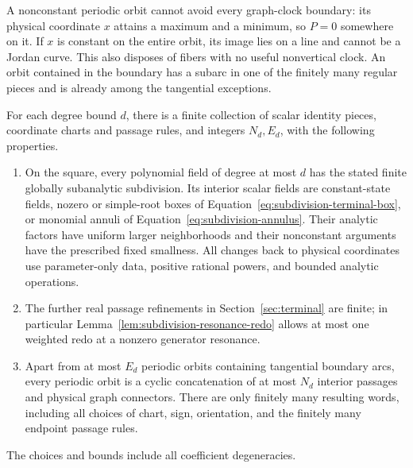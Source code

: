 A nonconstant periodic orbit cannot avoid every graph-clock boundary:
its physical coordinate $x$ attains a maximum and a minimum, so $P=0$
somewhere on it.  If $x$ is constant on the entire orbit, its image lies
on a line and cannot be a Jordan curve.  This also disposes of fibers
with no useful nonvertical clock.  An orbit contained in the boundary
has a subarc in one of the finitely many regular pieces and is already
among the tangential exceptions.

\begin{theorem}
\label{thm:finite-templates}
For each degree bound $d$, there is a finite collection of scalar
identity pieces, coordinate charts and passage rules, and integers
$N_d,E_d$, with the following properties.
\begin{enumerate}
\item On the square, every polynomial field of degree at most $d$ has
the stated finite globally subanalytic subdivision.  Its interior
scalar fields are constant-state fields, nozero or simple-root boxes
of Equation~\eqref{eq:subdivision-terminal-box}, or monomial annuli
of Equation~\eqref{eq:subdivision-annulus}.  Their analytic factors
have uniform larger neighborhoods and their nonconstant arguments
have the prescribed fixed smallness.  All changes back to physical
coordinates use parameter-only data, positive rational powers, and
bounded analytic operations.
\item The further real passage refinements in
Section~\ref{sec:terminal} are finite; in particular
Lemma~\ref{lem:subdivision-resonance-redo} allows at most one weighted
redo at a nonzero generator resonance.
\item Apart from at most $E_d$ periodic orbits containing tangential
boundary arcs, every periodic orbit is a cyclic concatenation of at
most $N_d$ interior passages and physical graph connectors.  There are
only finitely many resulting words, including all choices of chart,
sign, orientation, and the finitely many endpoint passage rules.
\end{enumerate}
The choices and bounds include all coefficient degeneracies.
\end{theorem}


